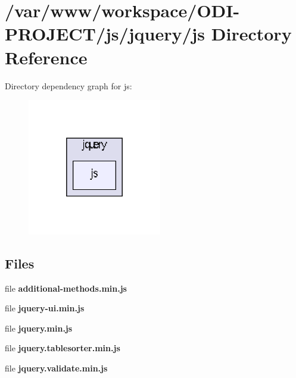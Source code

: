 \section{/var/www/workspace/\+O\+D\+I-\/\+P\+R\+O\+J\+E\+C\+T/js/jquery/js Directory Reference}
\label{dir_d36af31d3bdbaca49c12bf3d4e6748a0}
Directory dependency graph for js\+:\nopagebreak
\begin{figure}[H]
\begin{center}
\leavevmode
\includegraphics[width=166pt]{dir_d36af31d3bdbaca49c12bf3d4e6748a0_dep}
\end{center}
\end{figure}
\subsection*{Files}
\begin{DoxyCompactItemize}
\item 
file {\bfseries additional-\/methods.\+min.\+js}
\item 
file {\bfseries jquery-\/ui.\+min.\+js}
\item 
file {\bfseries jquery.\+min.\+js}
\item 
file {\bfseries jquery.\+tablesorter.\+min.\+js}
\item 
file {\bfseries jquery.\+validate.\+min.\+js}
\end{DoxyCompactItemize}

